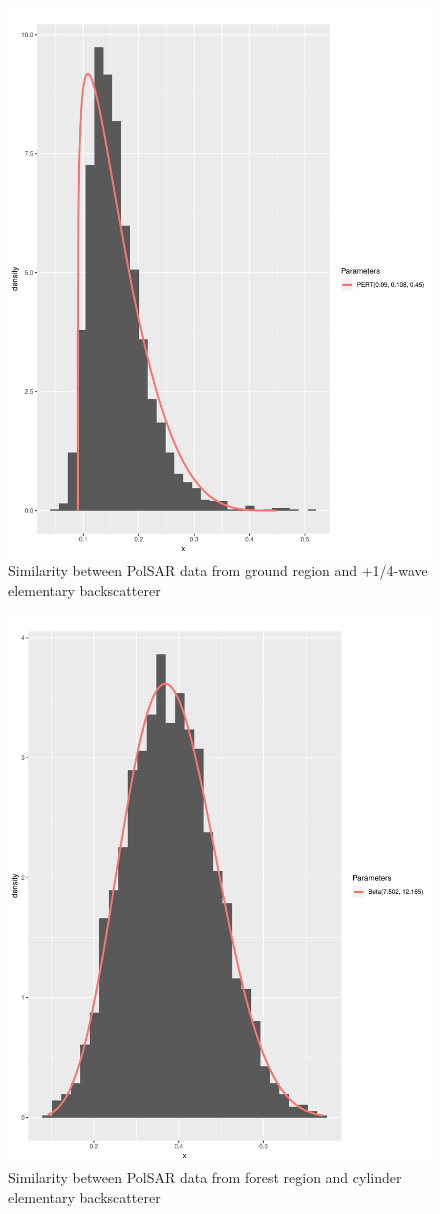 \documentclass[conference]{IEEEtran}
\begin{document}
\begin{figure}[!ht]
    \centering
    \includegraphics[width = .9\linewidth, height = .7\linewidth]{../../../Figures/paper_19_05/wvp_ground.pdf}
    \caption{Similarity between PolSAR data from ground region and +1/4-wave elementary backscatterer}
    \label{fig:gr_wvp}
\end{figure}

\begin{figure}[!ht]
    \centering
    \includegraphics[width = .9\linewidth, height = .7\linewidth]{../../../Figures/paper_19_05/cy_vegetation.pdf}
    \caption{Similarity between PolSAR data from forest region and cylinder elementary backscatterer}
    \label{fig:fr_cy}
\end{figure}
\end{document}
